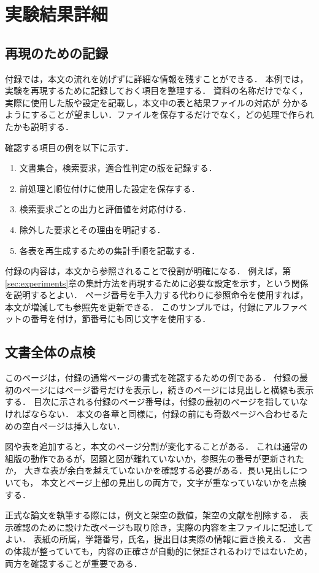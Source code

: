 \chapter{実験結果詳細}
\label{app:details}

\section{再現のための記録}
付録では，本文の流れを妨げずに詳細な情報を残すことができる．
本例では，実験を再現するために記録しておく項目を整理する．
資料の名称だけでなく，実際に使用した版や設定を記載し，本文中の表と結果ファイルの対応が
分かるようにすることが望ましい．ファイルを保存するだけでなく，どの処理で作られたかも説明する．

確認する項目の例を以下に示す．
\begin{enumerate}
  \item 文書集合，検索要求，適合性判定の版を記録する．
  \item 前処理と順位付けに使用した設定を保存する．
  \item 検索要求ごとの出力と評価値を対応付ける．
  \item 除外した要求とその理由を明記する．
  \item 各表を再生成するための集計手順を記載する．
\end{enumerate}

付録の内容は，本文から参照されることで役割が明確になる．
例えば，第\ref{sec:experiments}章の集計方法を再現するために必要な設定を示す，という関係を説明するとよい．
ページ番号を手入力する代わりに参照命令を使用すれば，本文が増減しても参照先を更新できる．
このサンプルでは，付録にアルファベットの番号を付け，節番号にも同じ文字を使用する．

\newpage
\section{文書全体の点検}
このページは，付録の通常ページの書式を確認するための例である．
付録の最初のページにはページ番号だけを表示し，続きのページには見出しと横線も表示する．
目次に示される付録のページ番号は，付録の最初のページを指していなければならない．
本文の各章と同様に，付録の前にも奇数ページへ合わせるための空白ページは挿入しない．

図や表を追加すると，本文のページ分割が変化することがある．
これは通常の組版の動作であるが，図題と図が離れていないか，参照先の番号が更新されたか，
大きな表が余白を越えていないかを確認する必要がある．長い見出しについても，
本文とページ上部の見出しの両方で，文字が重なっていないかを点検する．

正式な論文を執筆する際には，例文と架空の数値，架空の文献を削除する．
表示確認のために設けた改ページも取り除き，実際の内容を主ファイルに記述してよい．
表紙の所属，学籍番号，氏名，提出日は実際の情報に置き換える．
文書の体裁が整っていても，内容の正確さが自動的に保証されるわけではないため，両方を確認することが重要である．
